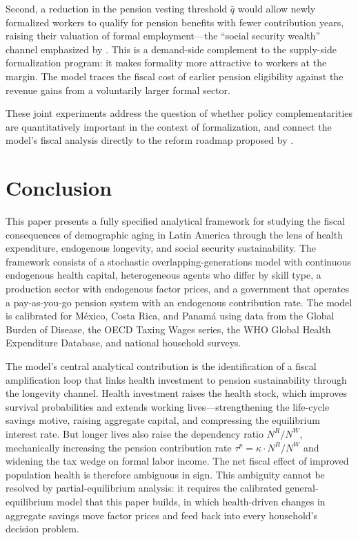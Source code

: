 \documentclass[12pt,a4paper]{article}
\begin{document}
Second, a reduction in the pension vesting threshold $\bar{q}$ would allow newly formalized workers to qualify for pension benefits with fewer contribution years, raising their valuation of formal employment---the ``social security wealth'' channel emphasized by \citet{WorldBankInformalizing2025}. This is a demand-side complement to the supply-side formalization program: it makes formality more attractive to workers at the margin. The model traces the fiscal cost of earlier pension eligibility against the revenue gains from a voluntarily larger formal sector.

These joint experiments address the question of whether policy complementarities are quantitatively important in the context of formalization, and connect the model's fiscal analysis directly to the reform roadmap proposed by \citet{WorldBankInformalizing2025}.


\section{Conclusion}
\label{sec:conclusion}

This paper presents a fully specified analytical framework for studying the fiscal consequences of demographic aging in Latin America through the lens of health expenditure, endogenous longevity, and social security sustainability. The framework consists of a stochastic overlapping-generations model with continuous endogenous health capital, heterogeneous agents who differ by skill type, a production sector with endogenous factor prices, and a government that operates a pay-as-you-go pension system with an endogenous contribution rate. The model is calibrated for M\'exico, Costa Rica, and Panam\'a using data from the Global Burden of Disease, the OECD Taxing Wages series, the WHO Global Health Expenditure Database, and national household surveys.

The model's central analytical contribution is the identification of a fiscal amplification loop that links health investment to pension sustainability through the longevity channel. Health investment raises the health stock, which improves survival probabilities and extends working lives---strengthening the life-cycle savings motive, raising aggregate capital, and compressing the equilibrium interest rate. But longer lives also raise the dependency ratio $N^R/N^W$, mechanically increasing the pension contribution rate $\tau^p = \kappa \cdot N^R/N^W$ and widening the tax wedge on formal labor income. The net fiscal effect of improved population health is therefore ambiguous in sign. This ambiguity cannot be resolved by partial-equilibrium analysis: it requires the calibrated general-equilibrium model that this paper builds, in which health-driven changes in aggregate savings move factor prices and feed back into every household's decision problem.
\end{document}
